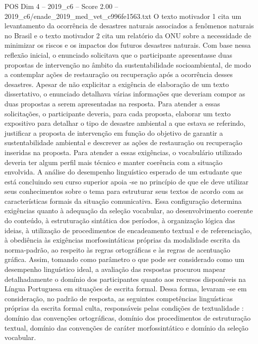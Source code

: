 \begin{textsample}{POS Dim 4 – 2019\_c6 – Score 2.00 – 2019\_c6/enade\_2019\_med\_vet\_c996fe1563.txt}
O texto motivador 1 cita um levantamento da ocorrência de desastres naturais associados a fenômenos naturais no Brasil e o texto motivador 2 cita um relatório da ONU sobre a necessidade de minimizar os riscos e os impactos dos futuros desastres naturais.
Com base nessa reflexão inicial, o enunciado solicitava que o participante apresentasse duas propostas de intervenção no âmbito da sustentabilidade socioambiental, de modo a contemplar ações de restauração ou recuperação após a ocorrência desses desastres.
Apesar de não explicitar a exigência de elaboração de um texto dissertativo, o enunciado detalhava várias informações que deveriam compor as duas propostas a serem apresentadas na resposta.
Para atender a essas solicitações, o participante deveria, para cada proposta, elaborar um texto expositivo para detalhar o tipo de desastre ambiental a que estava se referindo, justificar a proposta de intervenção em função do objetivo de garantir a sustentabilidade ambiental e descrever as ações de restauração ou recuperação inseridas na proposta.
Para atender a essas exigências, o vocabulário utilizado deveria ter algum perfil mais técnico e manter coerência com a situação envolvida.
A análise do desempenho linguístico esperado de um estudante que está concluindo seu curso superior apoia -se no princípio de que ele deve utilizar seus conhecimentos sobre o tema para estruturar seus textos de acordo com as características formais da situação comunicativa.
Essa configuração determina exigências quanto à adequação da seleção vocabular, ao desenvolvimento coerente do conteúdo, à estruturação sintática dos períodos, à organização lógica das ideias, à utilização de procedimentos de encadeamento textual e de referenciação, à obediência às exigências morfossintáticas próprias da modalidade escrita da norma-padrão, ao respeito às regras ortográficas e às regras de acentuação gráfica.
Assim, tomando como parâmetro o que pode ser considerado como um desempenho linguístico ideal, a avaliação das respostas procurou mapear detalhadamente o domínio dos participantes quanto aos recursos disponíveis na Língua Portuguesa em situações de escrita formal.
Dessa forma, levaram -se em consideração, no padrão de resposta, as seguintes competências linguísticas próprias da escrita formal culta, responsáveis pelas condições de textualidade : domínio das convenções ortográficas, domínio dos procedimentos de estruturação textual, domínio das convenções de caráter morfossintático e domínio da seleção vocabular.

\end{textsample}
